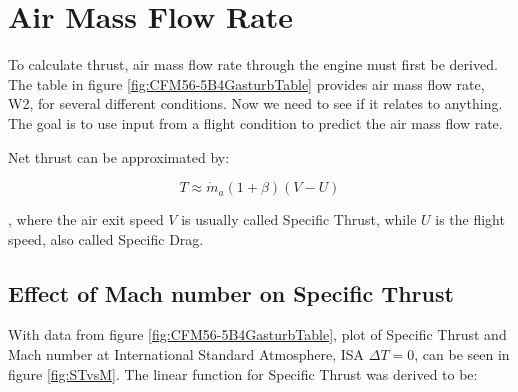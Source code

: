 \documentclass[english]{kththesis}
\begin{document}
\clearpage

\section{Air Mass Flow Rate}

To calculate thrust, air mass flow rate through the engine must first be derived. The table in figure \ref{fig:CFM56-5B4GasturbTable} provides air mass flow rate, W2, for several different conditions. Now we need to see if it relates to anything. The goal is to use input from a flight condition to predict the air mass flow rate.




Net thrust can be approximated by:

\begin{equation}
\label{eq:ThrustSimple}
T \approx \dot{m}_a (1+\beta) (V-U)
\end{equation}

, where the air exit speed $V$ is usually called Specific Thrust, while $U$ is the flight speed, also called Specific Drag.

\subsection{Effect of Mach number on Specific Thrust}

With data from figure \ref{fig:CFM56-5B4GasturbTable}, plot of Specific Thrust and Mach number at International Standard Atmosphere, ISA $\Delta T=0$, can be seen in figure \ref{fig:STvsM}.
The linear function for Specific Thrust was derived to be:
\end{document}
